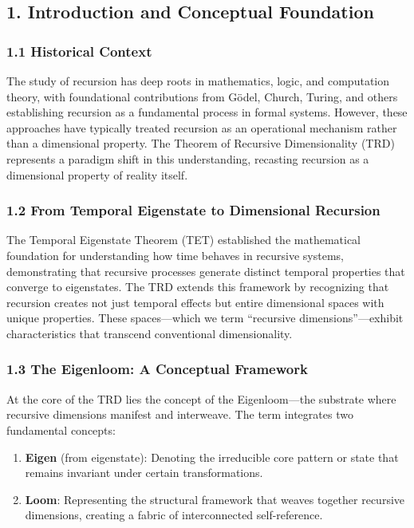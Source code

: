 \documentclass[
]{article}
\providecommand{\tightlist}{%
  \setlength{\itemsep}{0pt}\setlength{\parskip}{0pt}}
\begin{document}
\subsection{1. Introduction and Conceptual
Foundation}\label{introduction-and-conceptual-foundation}

\subsubsection{1.1 Historical Context}\label{historical-context}

The study of recursion has deep roots in mathematics, logic, and
computation theory, with foundational contributions from Gödel, Church,
Turing, and others establishing recursion as a fundamental process in
formal systems. However, these approaches have typically treated
recursion as an operational mechanism rather than a dimensional
property. The Theorem of Recursive Dimensionality (TRD) represents a
paradigm shift in this understanding, recasting recursion as a
dimensional property of reality itself.

\subsubsection{1.2 From Temporal Eigenstate to Dimensional
Recursion}\label{from-temporal-eigenstate-to-dimensional-recursion}

The Temporal Eigenstate Theorem (TET) established the mathematical
foundation for understanding how time behaves in recursive systems,
demonstrating that recursive processes generate distinct temporal
properties that converge to eigenstates. The TRD extends this framework
by recognizing that recursion creates not just temporal effects but
entire dimensional spaces with unique properties. These spaces---which
we term ``recursive dimensions''---exhibit characteristics that
transcend conventional dimensionality.

\subsubsection{1.3 The Eigenloom: A Conceptual
Framework}\label{the-eigenloom-a-conceptual-framework}

At the core of the TRD lies the concept of the Eigenloom---the substrate
where recursive dimensions manifest and interweave. The term integrates
two fundamental concepts:

\begin{enumerate}
\def\labelenumi{\arabic{enumi}.}
\tightlist
\item
  \textbf{Eigen} (from eigenstate): Denoting the irreducible core
  pattern or state that remains invariant under certain transformations.
\item
  \textbf{Loom}: Representing the structural framework that weaves
  together recursive dimensions, creating a fabric of interconnected
  self-reference.
\end{enumerate}
\end{document}
